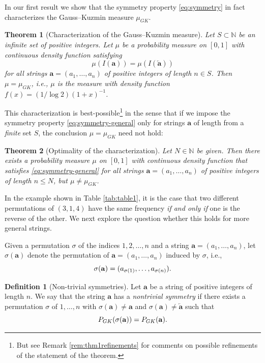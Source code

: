 \documentclass[10pt]{article}
\newtheorem{theorem}{Theorem}
\theoremstyle{definition}
\newtheorem{definition}[lemma]{Definition}
\numberwithin{equation}{section}
\numberwithin{lemma}{section}
\newcommand{\NN}{\mathbb{N}}
\newcommand{\bfa}{\mathbf{a}}
\newcommand{\bfar}{\overleftarrow{\bfa}}
\begin{document}
In our first result we show that the symmetry property
\eqref{eq:symmetry} in fact characterizes the Gauss--Kuzmin measure
$\mu_{GK}$.

\begin{theorem}[Characterization of the Gauss--Kuzmin measure]
\label{thm:gk-characterization}
Let $S\subset \NN$ be an infinite set of positive integers. 
Let $\mu$ be a probability measure on $[0,1]$  with continuous density
function satisfying
\begin{equation}
\label{eq:symmetry-general}
\mu(I(\bfa))=\mu(I(\bfar))
\end{equation}
for all strings $\bfa=(a_1,\dots,a_n)$ of positive integers 
of length $n\in S$. Then
$\mu=\mu_{GK}$, i.e., $\mu$ is the measure with density function
$f(x)=(1/\log
2)(1+x)^{-1}$.
\end{theorem}


This characterization is best-possible\footnote{But see Remark
\ref{rem:thm1refinements} for comments on possible refinements of the
statement of the theorem.}
in the sense that if we impose 
the symmetry property \eqref{eq:symmetry-general} only for strings
$\bfa$ of length from a \emph{finite} set $S$, the conclusion
$\mu=\mu_{GK}$ need not hold:

\begin{theorem}[Optimality of the characterization]
\label{thm:gk-characterization-optimality}
Let $N\in \NN$ be given. Then there exists 
a probability measure $\mu$ on $[0,1]$ with continuous density
function that satisfies \eqref{eq:symmetry-general} 
for all strings $\bfa=(a_1,\dots,a_n)$ of positive integers 
of length $n\le N$, but $\mu\not=\mu_{GK}$.
\end{theorem}

In the example shown in Table \ref{tab:table1}, it is the case that two
different permutations of $(3,1,4)$ have the same frequency \emph{if and only
if} one is the reverse of the other.   We next explore the question
whether this holds for more general strings. 

Given a permutation $\sigma$ of the indices $1,2,\dots,n$ and a string
$\bfa=(a_1,\dots,a_n)$, 
let $\sigma(\bfa)$ denote the permutation of $\bfa=(a_1,\dots,a_n)$ 
induced by $\sigma$, i.e.,
\begin{equation}
\notag
\sigma(\bfa)=(a_{\sigma(1)},\dots,a_{\sigma(n)}).
\end{equation}

\begin{definition}[Non-trivial symmetries]
\label{def:nontrivial-symmetries}
Let $\bfa$ be a string of positive integers of 
length $n$. We say that the string $\bfa$ has a
\emph{nontrivial symmetry} if there exists a permutation $\sigma$ of
$1,\dots,n$ with $\sigma(\bfa)\not=\bfa$ and $\sigma(\bfa)\not=\bfar$ 
such that
\begin{equation}
\notag
P_{GK}(\sigma(\bfa))=P_{GK}(\bfa).
\end{equation}
\end{definition}
\end{document}
